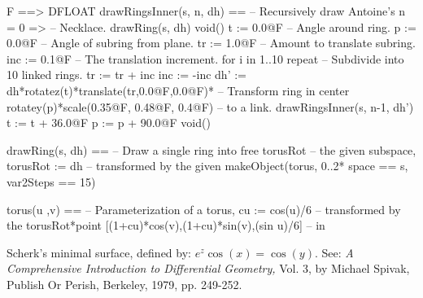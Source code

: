 \begin{xmpLinesNoResetPlain}
F ==> DFLOAT
drawRingsInner(s, n, dh) ==                              -- Recursively draw Antoine's
  n = 0 =>                                               -- \quad{}Necklace.
    drawRing(s, dh)
    void()
  t := 0.0@F                                             -- Angle around ring.
  p := 0.0@F                                             -- Angle of subring from plane.
  tr := 1.0@F                                            -- Amount to translate subring.
  inc := 0.1@F                                           -- The translation increment.
  for i in 1..10 repeat                                  -- Subdivide into 10 linked rings.
    tr := tr + inc
    inc := -inc
    dh' := dh*rotatez(t)*translate(tr,0.0@F,0.0@F)*      -- Transform ring in center
           rotatey(p)*scale(0.35@F, 0.48@F, 0.4@F)       -- \quad{}to a link.
    drawRingsInner(s, n-1, dh')
    t := t + 36.0@F
    p := p + 90.0@F
  void()

drawRing(s, dh) ==                                       -- Draw a single ring into
  free torusRot                                          -- \quad{}the given subspace,
  torusRot := dh                                         -- \quad{}transformed by the given
  makeObject(torus, 0..2*%
             space == s, var2Steps == 15)

torus(u ,v) ==                                           -- Parameterization of a torus,
  cu := cos(u)/6                                         -- \quad{}transformed by the
  torusRot*point [(1+cu)*cos(v),(1+cu)*sin(v),(sin u)/6] -- \quad{} in 
\end{xmpLinesNoResetPlain}

%
%

Scherk's minimal surface, defined by:
$e^z \cos(x) = \cos(y)$.
See: {\it A Comprehensive Introduction to Differential Geometry,} Vol. 3,
by Michael Spivak, Publish Or Perish, Berkeley, 1979, pp. 249-252.

